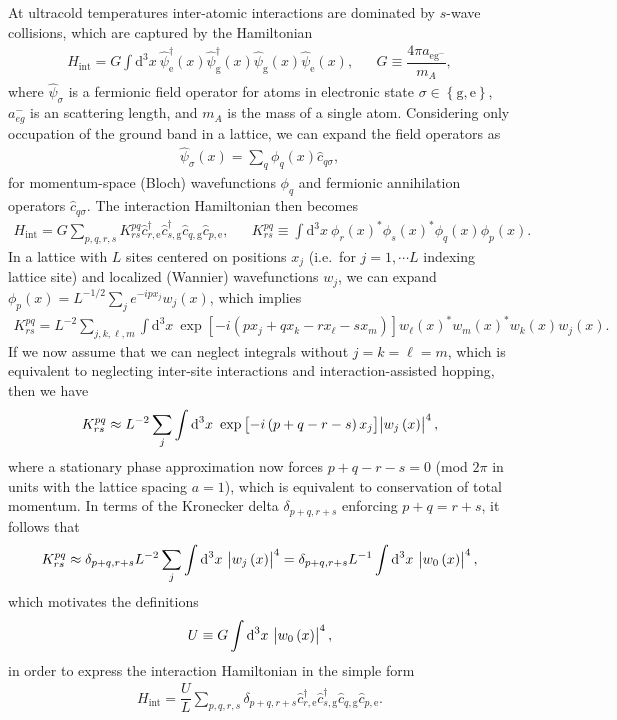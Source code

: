 \documentclass[aps,notitlepage,nofootinbib,11pt]{revtex4-1}
\renewcommand{\t}{\text} %
\newcommand{\f}[2]{\dfrac{#1}{#2}} %
\newcommand{\p}[1]{\left(#1\right)} %
\renewcommand{\sp}[1]{\left[#1\right]} %
\renewcommand{\set}[1]{\left\{#1\right\}} %
\renewcommand{\d}{\text{d}} %
\newcommand{\g}{\text{g}} %
\newcommand{\e}{\text{e}}
\newcommand{\1}{\mathds{1}}
\begin{document}
At ultracold temperatures inter-atomic interactions are dominated by
$s$-wave collisions, which are captured by the Hamiltonian
\begin{align}
  H_{\t{int}} = G \int \d^3x~
  \hat\psi_\e^\dag\p{x} \hat\psi_\g^\dag\p{x}
  \hat\psi_\g\p{x} \hat\psi_\e\p{x},
  &&
  G \equiv \f{4\pi a_{\e\g^-}}{m_A},
\end{align}
where $\hat\psi_\sigma$ is a fermionic field operator for atoms in
electronic state $\sigma\in\set{\g,\e}$, $a_{eg}^-$ is an scattering
length, and $m_A$ is the mass of a single atom.  Considering only
occupation of the ground band in a lattice, we can expand the field
operators as
\begin{align}
  \hat\psi_\sigma\p{x} = \sum_q \phi_q\p{x} \hat c_{q\sigma},
\end{align}
for momentum-space (Bloch) wavefunctions $\phi_q$ and fermionic
annihilation operators $\hat c_{q\sigma}$.  The interaction
Hamiltonian then becomes
\begin{align}
  H_{\t{int}} = G \sum_{p,q,r,s} K^{pq}_{rs}
  \hat c_{r,\e}^\dag \hat c_{s,\g}^\dag \hat c_{q,\g} \hat c_{p,\e},
  &&
  K^{pq}_{rs} \equiv \int \d^3x~
  \phi_r\p{x}^* \phi_s\p{x}^* \phi_q\p{x} \phi_p\p{x}.
\end{align}
In a lattice with $L$ sites centered on positions $x_j$ (i.e.~for
$j=1,\cdots L$ indexing lattice site) and localized (Wannier)
wavefunctions $w_j$, we can expand
$\phi_p\p{x}=L^{-1/2}\sum_je^{-ipx_j}w_j\p{x}$, which implies
\begin{align}
  K^{pq}_{rs} = L^{-2} \sum_{j,k,\ell,m} \int \d^3x~
  \exp\sp{-i\p{px_j+qx_k-rx_\ell-sx_m}}
  w_\ell\p{x}^* w_m\p{x}^* w_k\p{x} w_j\p{x}.
\end{align}
If we now assume that we can neglect integrals without $j=k=\ell=m$,
which is equivalent to neglecting inter-site interactions and
interaction-assisted hopping, then we have
\begin{align}
  K^{pq}_{rs} \approx L^{-2} \sum_j \int \d^3x~
  \exp\sp{-i\p{p+q-r-s}x_j} \abs{w_j\p{x}}^4,
\end{align}
where a stationary phase approximation now forces $p+q-r-s=0$ (mod
$2\pi$ in units with the lattice spacing $a=1$), which is equivalent
to conservation of total momentum.  In terms of the Kronecker delta
$\delta_{p+q,r+s}$ enforcing $p+q=r+s$, it follows that
\begin{align}
  K^{pq}_{rs} \approx \delta_{p+q,r+s} L^{-2}
  \sum_j \int \d^3x~ \abs{w_j\p{x}}^4
  = \delta_{p+q,r+s} L^{-1} \int \d^3x~ \abs{w_0\p{x}}^4,
\end{align}
which motivates the definitions
\begin{align}
  U \equiv G \int \d^3x~ \abs{w_0\p{x}}^4,
\end{align}
in order to express the interaction Hamiltonian in the simple form
\begin{align}
  H_{\t{int}} = \f{U}{L} \sum_{p,q,r,s}
  \delta_{p+q,r+s} \hat c_{r,\e}^\dag \hat c_{s,\g}^\dag
  \hat c_{q,\g} \hat c_{p,\e}.
  \label{eq:H_int_full}
\end{align}
\end{document}

